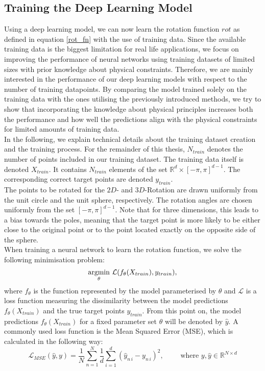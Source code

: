 \subsection{Training the Deep Learning Model}
\indent Using a deep learning model, we can now learn the rotation function $rot$ as defined in equation \eqref{rot_fn} with the use of training data. Since the available training data is the biggest limitation for real life applications, we focus on improving the performance of neural networks using training datasets of limited sizes with prior knowledge about physical constraints. Therefore, we are mainly interested in the performance of our deep learning models with respect to the number of training datapoints. By comparing the model trained solely on the training data with the ones utilising the previously introduced methods, we try to show that incorporating the knowledge about physical principles increases both the performance and how well the predictions align with the physical constraints for limited amounts of training data. \\
\indent In the following, we explain technical details about the training dataset creation and the training process. For the remainder of this thesis, $N_{train}$ denotes the number of points included in our training dataset. The training data itself is denoted $X_{train}$. It contains $N_{train}$ elements of the set $\mathbb{R}^{d} \times [- \pi, \pi] ^{d-1}$. The corresponding correct target points are denoted $y_{train}$.\\
\indent The points to be rotated for the $2D$- and $3D$-Rotation are drawn uniformly from the unit circle and the unit sphere, respectively. The rotation angles are chosen uniformly from the set $[-\pi, \pi]^{d-1}$. Note that for three dimensions, this leads to a bias towards the poles, meaning that the target point is more likely to be either close to the original point or to the point located exactly on the opposite side of the sphere.\\
\indent When training a neural network to learn the rotation function, we solve the following minimisation problem:
\[\underset{\theta}{\operatorname*{argmin}} \,\, \mathcal{L}(f_{\theta} (X_{train}), y_{train}), \]
where $f_\theta$ is the function represented by the model parameterised by $\theta$ and $\mathcal{L}$ is a loss function measuring the dissimilarity between the model predictions $f_{\theta} (X_{train})$ and the true target points $y_{train}$. From this point on, the model predictions $f_{\theta} (X_{train})$ for a fixed parameter set $\theta$ will be denoted by $\hat{y}$.
A commonly used loss function is the Mean Squared Error (MSE), which is calculated in the following way:
\begin{equation}
\label{eq:mse}
\mathcal{L}_{MSE}(\hat{y}, y) = \frac{1}{N}\sum_{n = 1}^{N} \frac{1}{d} \sum_{i = 1}^{d} (\hat{y}_{n\,i} - y_{n\,i})^2, \qquad \text{ where } y, \hat{y} \in \mathbb{R}^{N \times d}
\end{equation}

